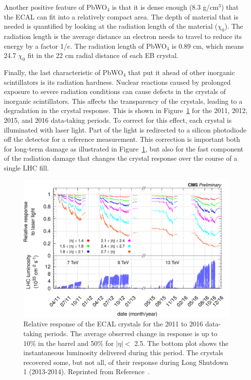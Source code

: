 Another positive feature of PbWO$_4$ is that it is dense enough (8.3 g/cm$^3$) that the ECAL can fit into a relatively compact area. The depth of material that is needed is quantified by looking at the radiation length of the material ($\chi_0$). The radiation length is the average distance an electron needs to travel to reduce its energy by a factor 1/$e$. The radiation length of PbWO$_4$ is 0.89 cm, which means 24.7 $\chi_0$ fit in the 22 cm radial distance of each EB crystal.

Finally, the last characteristic of PbWO$_4$ that put it ahead of other inorganic scintillators is its radiation hardness. Nuclear reactions caused by prolonged exposure to severe radiation conditions can cause defects in the crystals of inorganic scintillators. This affects the transparency of the crystals, leading to a degradation in the crystal response. This is shown in Figure~\ref{fig:ecal_response} for the 2011, 2012, 2015, and 2016 data-taking periods. To correct for this effect, each crystal is illuminated with laser light. Part of the light is redirected to a silicon photodiode off the detector for a reference measurement. This correction is important both for long-term damage as illustrated in Figure~\ref{fig:ecal_response}, but also for the fast component of the radiation damage that changes the crystal response over the course of a single LHC fill.

\begin{figure}[h!]
	\centering
	\includegraphics[width=\linewidth]{Figures/Detector/ecal_response.png}
       \caption[Relative response of the ECAL crystals for the 2011 to 2016 data-taking periods.]
       { Relative response of the ECAL crystals for the 2011 to 2016 data-taking periods.
       The average observed change in response is up to 10\% in the barrel and 50\% for $|\eta| <$ 2.5. 
       The bottom plot shows the instantaneous luminosity delivered during this period. The crystals recovered 
       some, but not all, of their response during Long Shutdown 1 (2013-2014). Reprinted from Reference~\cite{ECALDPGtwiki}.}
   	\label{fig:ecal_response}
\end{figure}


